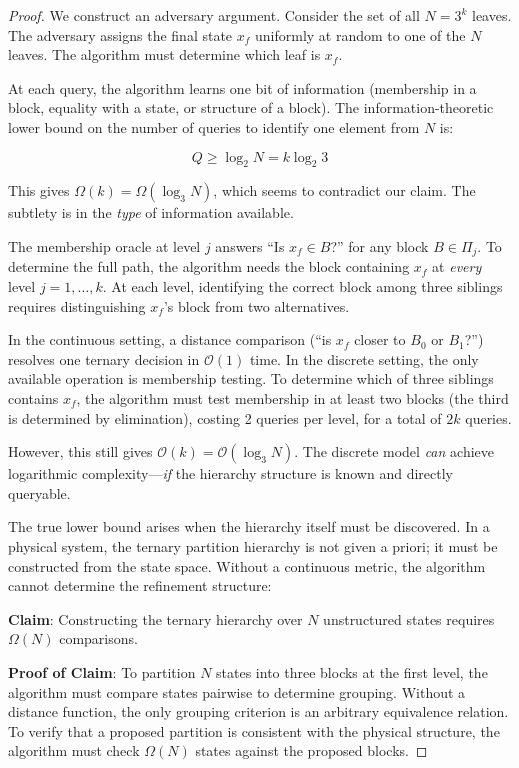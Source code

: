 \documentclass[12pt,twocolumn]{article}
\begin{document}
\begin{proof}
We construct an adversary argument. Consider the set of all $N = 3^k$ leaves. The adversary assigns the final state $x_f$ uniformly at random to one of the $N$ leaves. The algorithm must determine which leaf is $x_f$.

At each query, the algorithm learns one bit of information (membership in a block, equality with a state, or structure of a block). The information-theoretic lower bound on the number of queries to identify one element from $N$ is:

\begin{equation}
\label{eq:info_lower}
Q \geq \log_2 N = k \log_2 3
\end{equation}

This gives $\Omega(k) = \Omega(\log_3 N)$, which seems to contradict our claim. The subtlety is in the \emph{type} of information available.

The membership oracle at level $j$ answers ``Is $x_f \in B$?'' for any block $B \in \Pi_j$. To determine the full path, the algorithm needs the block containing $x_f$ at \emph{every} level $j = 1, \ldots, k$. At each level, identifying the correct block among three siblings requires distinguishing $x_f$'s block from two alternatives.

In the continuous setting, a distance comparison (``is $x_f$ closer to $B_0$ or $B_1$?'') resolves one ternary decision in $\mathcal{O}(1)$ time. In the discrete setting, the only available operation is membership testing. To determine which of three siblings contains $x_f$, the algorithm must test membership in at least two blocks (the third is determined by elimination), costing 2 queries per level, for a total of $2k$ queries.

However, this still gives $\mathcal{O}(k) = \mathcal{O}(\log_3 N)$. The discrete model \emph{can} achieve logarithmic complexity---\emph{if} the hierarchy structure is known and directly queryable.

The true lower bound arises when the hierarchy itself must be discovered. In a physical system, the ternary partition hierarchy is not given a priori; it must be constructed from the state space. Without a continuous metric, the algorithm cannot determine the refinement structure:

\textbf{Claim}: Constructing the ternary hierarchy over $N$ unstructured states requires $\Omega(N)$ comparisons.

\textbf{Proof of Claim}: To partition $N$ states into three blocks at the first level, the algorithm must compare states pairwise to determine grouping. Without a distance function, the only grouping criterion is an arbitrary equivalence relation. To verify that a proposed partition is consistent with the physical structure, the algorithm must check $\Omega(N)$ states against the proposed blocks.


\end{proof}
\end{document}
